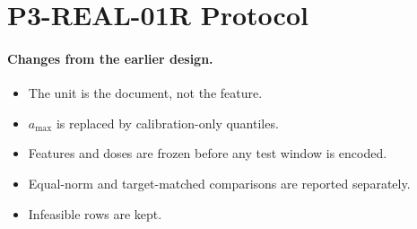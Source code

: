 \documentclass{article}
\theoremstyle{plain}
\theoremstyle{definition}
\theoremstyle{remark}
\newcommand{\LN}{\textsc{ln}}
\begin{document}
\begin{table}[h]
  \caption{Pilot, target-matched at $q_{99}$ (quality part): KL over the 16 positions after
  the edit, in units of $10^{-3}$ nats, and edit norm, with 95\% document-cluster bootstrap
  intervals.}
  \label{tab:pilot-ci-q}
  \centering
  \scriptsize
  \setlength{\tabcolsep}{3pt}
  
\end{table}

\begin{table}[h]
  \caption{Pilot: per-document paired differences, \LN{} minus decoder (target-matched), with
  95\% document-cluster bootstrap intervals. $\Delta$KL is in units of $10^{-3}$ nats; the
  originally-active drift of the \LN{} edit is zero by construction, so its paired difference
  equals minus the decoder's $D_{\mathrm{orig}}$ in \cref{tab:pilot-ci}.}
  \label{tab:pilot-paired}
  \centering
  \footnotesize
  
\end{table}

\begin{table}[h]
  \caption{Pilot, equal norm ($\rho = 0.1\times$ median residual norm). ``Target gain'' is the
  target-feature change per unit edit norm, a metric added as an in-run amendment
  (\cref{sec:pilot}). Mean-only rows are omitted (raw off-slice readout).}
  \label{tab:pilot-eq}
  \centering
  \small
  \setlength{\tabcolsep}{2pt}
  
\end{table}

\section{P3-REAL-01R Protocol}
\label{app:real01r}
\paragraph{Changes from the earlier design.}
\begin{itemize}
  \item The unit is the document, not the feature.
  \item $a_{\max}$ is replaced by calibration-only quantiles.
  \item Features and doses are frozen before any test window is encoded.
  \item Equal-norm and target-matched comparisons are reported separately.
  \item Infeasible rows are kept.
\end{itemize}
\end{document}
